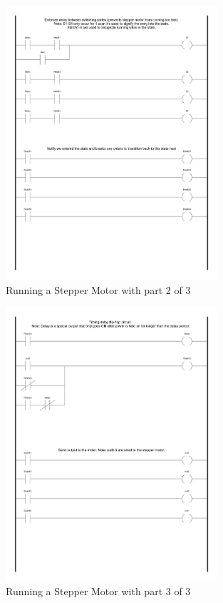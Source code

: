 \begin{figure}[h]
    \centering
    \includegraphics[width=0.7\textwidth]{./images/ladderlogic_stepper2.pdf}
    \caption{Running a Stepper Motor with  part 2 of 3}
    \label{fig:ladderlogic_stepper1}
\end{figure}

\begin{figure}[h]
    \centering
    \includegraphics[width=0.7\textwidth]{./images/ladderlogic_stepper3.pdf}
    \caption{Running a Stepper Motor with  part 3 of 3}
    \label{fig:ladderlogic_stepper1}
\end{figure}